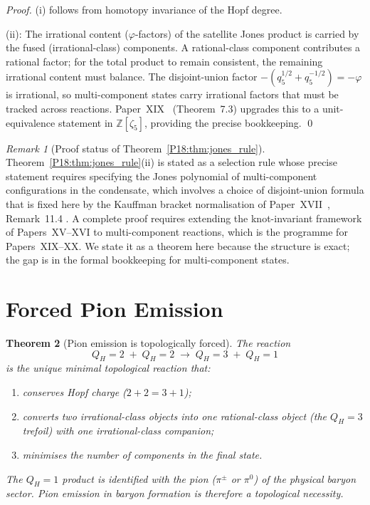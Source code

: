 \documentclass[11pt,a4paper]{article}
\newtheorem{theorem}{Theorem}[section]
\theoremstyle{definition}\newtheorem{definition}[theorem]{Definition}
\theoremstyle{remark}
\newtheorem{remark}[theorem]{Remark}
\newcommand{\vp}{\varphi}
\newcommand{\QH}{Q_H}
\begin{document}
\begin{proof}
(i) follows from homotopy invariance of the Hopf degree.

(ii): The irrational content ($\vp$-factors) of the satellite Jones
product is carried by the fused (irrational-class) components.
A rational-class component contributes a rational factor; for
the total product to remain consistent, the remaining irrational
content must balance.  The disjoint-union factor
$-(q_5^{1/2}+q_5^{-1/2})=-\vp$ is irrational, so multi-component
states carry irrational factors that must be tracked across reactions.
Paper~XIX~\cite{Paper19} (Theorem~7.3) %
upgrades this to a unit-equivalence statement in $\mathbb{Z}[\zeta_5]$,
providing the precise bookkeeping.
\qed
\end{proof}

\begin{remark}[Proof status of Theorem~\ref{P18:thm:jones_rule}]
Theorem~\ref{P18:thm:jones_rule}(ii) is stated as a selection
rule whose precise statement requires specifying the Jones polynomial
of multi-component configurations in the condensate, which involves
a choice of disjoint-union formula that is fixed here by the Kauffman
bracket normalisation of Paper~XVII~\cite{Paper17},
Remark~11.4%
.  A complete proof requires extending
the knot-invariant framework of Papers~XV--XVI to multi-component
reactions, which is the programme for Papers~XIX--XX.  We state it
as a theorem here because the structure is exact; the gap is in the
formal bookkeeping for multi-component states.
\end{remark}

\section{Forced Pion Emission}
\label{P18:sec:pion}

\begin{theorem}[Pion emission is topologically forced]
\label{P18:thm:pion_forced}
The reaction
\begin{equation}
  \QH=2 \;+\; \QH=2 \;\longrightarrow\; \QH=3 \;+\; \QH=1
  \label{P18:eq:reaction_pion}
\end{equation}
is the unique minimal topological reaction that:
\begin{enumerate}[noitemsep,label=(\roman*)]
\item conserves Hopf charge ($2+2=3+1$);
\item converts two irrational-class objects into one rational-class
  object (the $\QH=3$ trefoil) with one irrational-class companion;
\item minimises the number of components in the final state.
\end{enumerate}
The $\QH=1$ product is identified with the pion ($\pi^\pm$ or
$\pi^0$) of the physical baryon sector.  Pion emission in baryon
formation is therefore a topological necessity.
\end{theorem}
\end{document}
